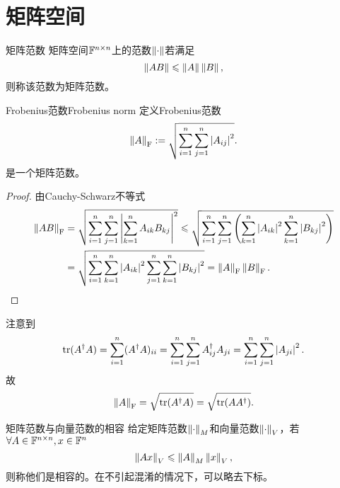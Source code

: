 \section{矩阵空间}
\label{sec:matrix space}

\begin{definition}
    {矩阵范数}{}
    矩阵空间$\mathbb F^{n\times n}$上的范数$\left\lVert\cdot\right\rVert$若满足
    \begin{equation}
        \left\lVert AB\right\rVert\leqslant\left\lVert A\right\rVert\left\lVert B\right\rVert,
    \end{equation}
    则称该范数为矩阵范数。
\end{definition}

\newcommand{\Forb}[1]{\norm{#1}_{\mathrm F}}


\begin{example}
    {Frobenius范数}{Frobenius norm}
    定义Frobenius范数
    \begin{equation}
        \Forb A:=\sqrt{\sum_{i=1}^n\sum_{j=1}^n\abs{A_{ij}}^2}.
    \end{equation}
    是一个矩阵范数。
    \begin{proof}
        由Cauchy-Schwarz不等式
        \begin{align*}
            \Forb{AB}&=\sqrt{\sum_{i=1}^n\sum_{j=1}^n\abs{\sum_{k=1}^nA_{ik}B_{kj}}^2}\leq\sqrt{\sum_{i=1}^n\sum_{j=1}^n\kh{\sum_{k=1}^n\abs{A_{ik}}^2\sum_{k=1}^n\abs{B_{kj}}^2}}\\
            &=\sqrt{\sum_{i=1}^n\sum_{k=1}^n\abs{A_{ik}}^2\sum_{j=1}^n\sum_{k=1}^n\abs{B_{kj}}^2}=\Forb A\Forb B.
            \qedhere
        \end{align*}
    \end{proof}
    \tcblower
    注意到
    \[
        \operatorname{tr}(A^\dagger A)=\sum_{i=1}^n(A^\dagger A)_{ii}=\sum_{i=1}^n\sum_{j=1}^nA^\dagger_{ij}A_{ji}=\sum_{i=1}^n\sum_{j=1}^n\left\lvert A_{ji}\right\rvert^2.
    \]
    故
    \begin{equation}
        \Forb A=\sqrt{\tr(A\dg A)}=\sqrt{\tr(AA\dg)}.
    \end{equation}
\end{example}

\begin{definition}
    {矩阵范数与向量范数的相容}{}
    给定矩阵范数$\left\lVert\cdot\right\rVert_M$和向量范数$\left\lVert\cdot\right\rVert_V$，若$\forall A\in\mathbb F^{n\times n},x\in\mathbb F^n$ 
    \begin{equation}
        \left\lVert Ax\right\rVert_V\leqslant\left\lVert A\right\rVert_M\left\lVert x\right\rVert_V,
    \end{equation}
    则称他们是相容的。在不引起混淆的情况下，可以略去下标。
\end{definition}

